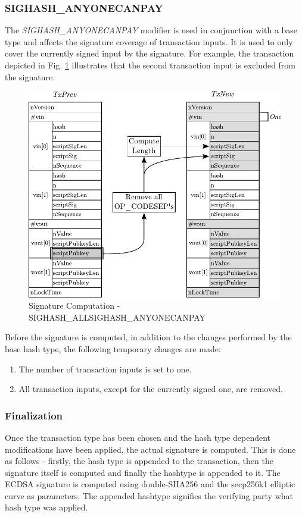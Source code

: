 \clearpage
\subsubsection*{SIGHASH\_ANYONECANPAY}
The \emph{SIGHASH\_ANYONECANPAY} modifier is used in conjunction with a base type and affects the signature coverage of transaction inputs. It is used to only cover the currently signed input by the signature. For example, the transaction depicted in Fig. \ref{fig:SigHash-Anyone} illustrates that the second transaction input is excluded from the signature.

\begin{figure}[ht!]
 \centering
 \includegraphics[scale=0.9]{images/SIGHASH_ANYONECANPAY.pdf}
 \caption{Signature Computation - SIGHASH\_ALL\textbar SIGHASH\_ANYONECANPAY} \label{fig:SigHash-Anyone}
\end{figure}

\noindent
Before the signature is computed, in addition to the changes performed by the base hash type, the following temporary changes are made:
\begin{enumerate}[label=\alph*), leftmargin=1cm]
\item The number of transaction inputs is set to one.
\item All transaction inputs, except for the currently signed one, are removed.
\end{enumerate}

\clearpage
\subsubsection{Finalization}
Once the transaction type has been chosen and the hash type dependent modifications have been applied, the actual signature is computed. This is done as follows - firstly, the hash type is appended to the transaction, then the signature itself is computed and finally the hashtype is appended to it. The ECDSA signature is computed using double-SHA256 and the secp256k1 elliptic curve as parameters. The appended hashtype signifies the verifying party what hash type was applied.

